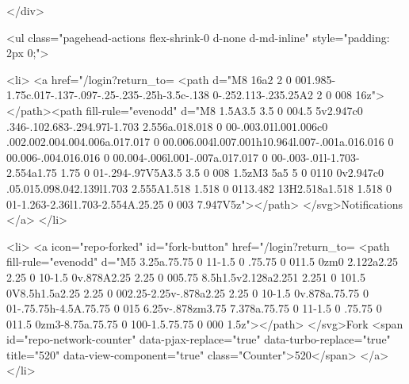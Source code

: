         </div>

          <ul class="pagehead-actions flex-shrink-0 d-none d-md-inline" style="padding: 2px 0;">

      

  <li>
          <a href="/login?return_to=%
    <path d="M8 16a2 2 0 001.985-1.75c.017-.137-.097-.25-.235-.25h-3.5c-.138 0-.252.113-.235.25A2 2 0 008 16z"></path><path fill-rule="evenodd" d="M8 1.5A3.5 3.5 0 004.5 5v2.947c0 .346-.102.683-.294.97l-1.703 2.556a.018.018 0 00-.003.01l.001.006c0 .002.002.004.004.006a.017.017 0 00.006.004l.007.001h10.964l.007-.001a.016.016 0 00.006-.004.016.016 0 00.004-.006l.001-.007a.017.017 0 00-.003-.01l-1.703-2.554a1.75 1.75 0 01-.294-.97V5A3.5 3.5 0 008 1.5zM3 5a5 5 0 0110 0v2.947c0 .05.015.098.042.139l1.703 2.555A1.518 1.518 0 0113.482 13H2.518a1.518 1.518 0 01-1.263-2.36l1.703-2.554A.25.25 0 003 7.947V5z"></path>
</svg>Notifications
</a>
  </li>

  <li>
          <a icon="repo-forked" id="fork-button" href="/login?return_to=%
    <path fill-rule="evenodd" d="M5 3.25a.75.75 0 11-1.5 0 .75.75 0 011.5 0zm0 2.122a2.25 2.25 0 10-1.5 0v.878A2.25 2.25 0 005.75 8.5h1.5v2.128a2.251 2.251 0 101.5 0V8.5h1.5a2.25 2.25 0 002.25-2.25v-.878a2.25 2.25 0 10-1.5 0v.878a.75.75 0 01-.75.75h-4.5A.75.75 0 015 6.25v-.878zm3.75 7.378a.75.75 0 11-1.5 0 .75.75 0 011.5 0zm3-8.75a.75.75 0 100-1.5.75.75 0 000 1.5z"></path>
</svg>Fork
    <span id="repo-network-counter" data-pjax-replace="true" data-turbo-replace="true" title="520" data-view-component="true" class="Counter">520</span>
</a>
  </li>

